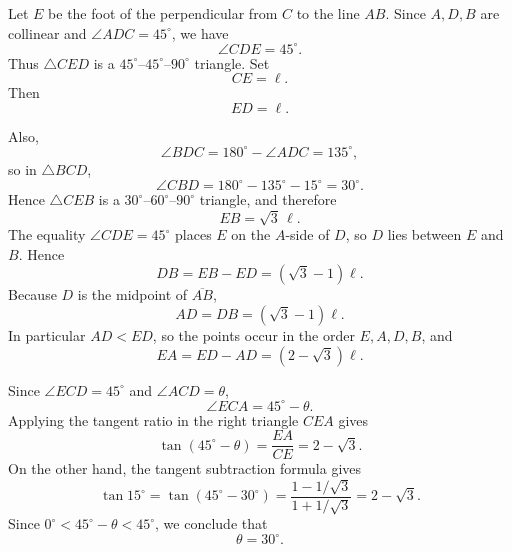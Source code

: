     \begin{solutions}
        \begin{solution}
            Let $E$ be the foot of the perpendicular from $C$ to the line $AB$.
            Since $A,D,B$ are collinear and $\angle ADC=45^\circ$, we have
            \[
                \angle CDE=45^\circ.
            \]
            Thus $\triangle CED$ is a $45^\circ$--$45^\circ$--$90^\circ$ triangle.
            Set
            \[
                CE=\ell.
            \]
            Then
            \[
                ED=\ell.
            \]

            Also,
            \[
                \angle BDC
                =
                180^\circ-\angle ADC
                =
                135^\circ,
            \]
            so in $\triangle BCD$,
            \[
                \angle CBD
                =
                180^\circ-135^\circ-15^\circ
                =
                30^\circ.
            \]
            Hence $\triangle CEB$ is a $30^\circ$--$60^\circ$--$90^\circ$ triangle, and therefore
            \[
                EB=\sqrt{3}\,\ell.
            \]
            The equality $\angle CDE=45^\circ$ places $E$ on the $A$-side of $D$,
            so $D$ lies between $E$ and $B$. Hence
            \[
                DB
                =
                EB-ED
                =
                (\sqrt{3}-1)\ell.
            \]
            Because $D$ is the midpoint of $\overline{AB}$,
            \[
                AD=DB=(\sqrt{3}-1)\ell.
            \]
            In particular $AD<ED$, so the points occur in the order $E,A,D,B$, and
            \[
                EA
                =
                ED-AD
                =
                (2-\sqrt{3})\ell.
            \]

            Since $\angle ECD=45^\circ$ and $\angle ACD=\theta$,
            \[
                \angle ECA=45^\circ-\theta.
            \]
            Applying the tangent ratio in the right triangle $CEA$ gives
            \[
                \tan(45^\circ-\theta)
                =
                \frac{EA}{CE}
                =
                2-\sqrt{3}.
            \]
            On the other hand, the tangent subtraction formula gives
            \[
                \tan 15^\circ
                =
                \tan(45^\circ-30^\circ)
                =
                \frac{1-1/\sqrt{3}}{1+1/\sqrt{3}}
                =
                2-\sqrt{3}.
            \]
            Since $0^\circ<45^\circ-\theta<45^\circ$, we conclude that
            \[
                \boxed{\theta=30^\circ}.
            \]
        \end{solution}


\end{solutions}
